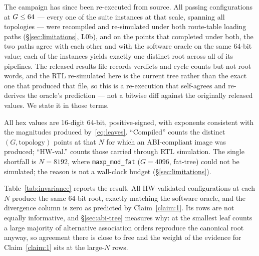 \documentclass[journal,10pt]{IEEEtran}
\theoremstyle{plain}
\theoremstyle{definition}
\theoremstyle{remark}
\newcommand{\sprs}{\textsc{SPRS}}
\newcommand{\sv}[1]{\texttt{#1}}
\begin{document}
The campaign has since been re-executed from source. All \RouteRuns{} passing
configurations at $G \le 64$ --- every one of the \RouteReexecInst{}
suite instances at that scale, spanning all \RouteTopoCount{} topologies ---
were recompiled and re-simulated under both route-table loading paths
(\S\ref{sec:limitations}, L0b), and on the \RouteReexec{} points that
completed under both, the two paths agree with each other and with the
software oracle on the same 64-bit value; each of the \RouteReexecInst{}
instances yields exactly one distinct root across all of its pipelines. The released results file records verdicts and cycle counts but
not root words, and the RTL re-simulated here is the current tree rather than
the exact one that produced that file, so this is a re-execution that
self-agrees and re-derives the oracle's prediction --- not a bitwise diff
against the originally released values. We state it in those terms.

\begin{table}[!t]
\caption{Cross-topology bitwise invariance.  Each row aggregates all
  HW-validated \sprs{} configurations at the given $N$ over all same-$N$
  $(G, \text{topology})$ pairs and all compiler triples. ``Divergent''
  is by Claim~\ref{claim:1} expected to be zero. The two mutation columns
  count injected mutants that the harness \emph{flagged}
  (\S\ref{sec:method-mutation}); as discussed below, a flag is a value
  mismatch for leaf corruption but usually a fail-stop for address
  substitution, and only the former bears on oracle non-vacuity.}
\label{tab:invariance}
\centering
\footnotesize
\renewcommand{\arraystretch}{1.15}

\vspace{2pt}

\footnotesize
All hex values are 16-digit 64-bit, positive-signed, with exponents
consistent with the magnitudes produced by~\eqref{eq:leaves}.
``Compiled'' counts the distinct $(G,\text{topology})$ points at that $N$ for
which an ABI-compliant image was produced; ``HW-val.'' counts those carried
through RTL simulation. The single shortfall is $N{=}8192$, where
\sv{maxp\_mod\_fat} ($G{=}4096$, fat-tree) could not be simulated; the reason
is not a wall-clock budget (\S\ref{sec:limitations}).
\end{table}

Table~\ref{tab:invariance} reports the result. All HW-validated
configurations at each $N$ produce the same 64-bit root, exactly
matching the software oracle, and the divergence column is zero as
predicted by Claim~\ref{claim:1}. Its rows are not equally informative,
and \S\ref{sec:abi-tree} measures why: at the smallest leaf counts a large
majority of alternative association orders reproduce the canonical root
anyway, so agreement there is close to free and the weight of the evidence
for Claim~\ref{claim:1} sits at the large-$N$ rows.
\end{document}
